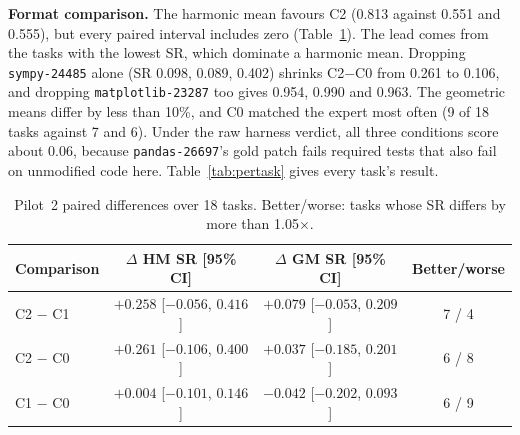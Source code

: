 \documentclass[conference]{IEEEtran}
\begin{document}
\textbf{Format comparison.} The harmonic mean favours C2 (0.813 against 0.551
and 0.555), but every paired interval includes zero
(Table~\ref{tab:paired}). The lead comes from the tasks with the lowest SR,
which dominate a harmonic mean. Dropping \texttt{sympy-24485} alone (SR 0.098,
0.089, 0.402) shrinks C2$-$C0 from 0.261 to 0.106, and dropping
\texttt{matplotlib-23287} too gives 0.954, 0.990 and 0.963. The geometric
means differ by less than 10\%, and C0 matched the expert most often (9 of 18
tasks against 7 and 6). Under the raw harness verdict, all three conditions
score about 0.06, because \texttt{pandas-26697}'s gold patch fails required
tests that also fail on unmodified code here. Table~\ref{tab:pertask} gives
every task's result.

\begin{table}[t]
\caption{Pilot~2 paired differences over 18 tasks. Better/worse: tasks whose
SR differs by more than 1.05$\times$.}
\label{tab:paired}
\centering
\scriptsize
\setlength{\tabcolsep}{2.5pt}
\begin{tabular}{@{}lccc@{}}
\toprule
Comparison & $\Delta$ HM SR [95\% CI] & $\Delta$ GM SR [95\% CI] & Better/worse \\
\midrule
C2 $-$ C1 & $+0.258$ [$-0.056$, $0.416$] & $+0.079$ [$-0.053$, $0.209$] & 7 / 4 \\
C2 $-$ C0 & $+0.261$ [$-0.106$, $0.400$] & $+0.037$ [$-0.185$, $0.201$] & 6 / 8 \\
C1 $-$ C0 & $+0.004$ [$-0.101$, $0.146$] & $-0.042$ [$-0.202$, $0.093$] & 6 / 9 \\
\bottomrule
\end{tabular}
\end{table}
\end{document}
